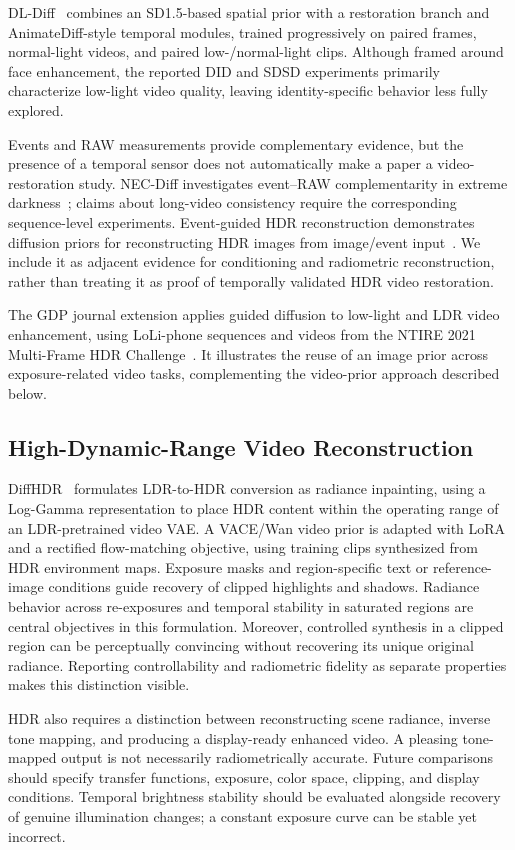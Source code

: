 DL-Diff~\cite{dldiff} combines an SD1.5-based spatial prior with a restoration branch and AnimateDiff-style temporal modules, trained progressively on paired frames, normal-light videos, and paired low-/normal-light clips. Although framed around face enhancement, the reported DID and SDSD experiments primarily characterize low-light video quality, leaving identity-specific behavior less fully explored.

Events and RAW measurements provide complementary evidence, but the presence of a temporal sensor does not automatically make a paper a video-restoration study. NEC-Diff investigates event--RAW complementarity in extreme darkness~\cite{necdiff}; claims about long-video consistency require the corresponding sequence-level experiments. Event-guided HDR reconstruction demonstrates diffusion priors for reconstructing HDR images from image/event input~\cite{eventhdr}. We include it as adjacent evidence for conditioning and radiometric reconstruction, rather than treating it as proof of temporally validated HDR video restoration.

The GDP journal extension applies guided diffusion to low-light and LDR video enhancement, using LoLi-phone sequences and videos from the NTIRE 2021 Multi-Frame HDR Challenge~\cite{gdp}. It illustrates the reuse of an image prior across exposure-related video tasks, complementing the video-prior approach described below.

\subsection{High-Dynamic-Range Video Reconstruction}
DiffHDR~\cite{diffhdr} formulates LDR-to-HDR conversion as radiance inpainting, using a Log-Gamma representation to place HDR content within the operating range of an LDR-pretrained video VAE. A VACE/Wan video prior is adapted with LoRA and a rectified flow-matching objective, using training clips synthesized from HDR environment maps. Exposure masks and region-specific text or reference-image conditions guide recovery of clipped highlights and shadows. Radiance behavior across re-exposures and temporal stability in saturated regions are central objectives in this formulation. Moreover, controlled synthesis in a clipped region can be perceptually convincing without recovering its unique original radiance. Reporting controllability and radiometric fidelity as separate properties makes this distinction visible.

HDR also requires a distinction between reconstructing scene radiance, inverse tone mapping, and producing a display-ready enhanced video. A pleasing tone-mapped output is not necessarily radiometrically accurate. Future comparisons should specify transfer functions, exposure, color space, clipping, and display conditions. Temporal brightness stability should be evaluated alongside recovery of genuine illumination changes; a constant exposure curve can be stable yet incorrect.

